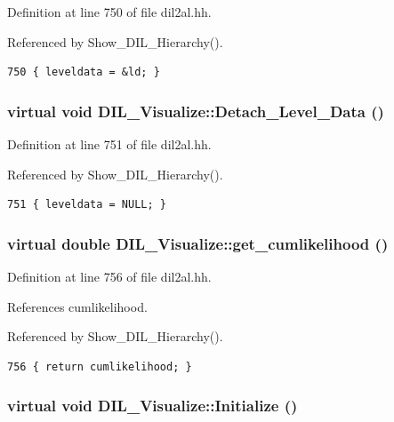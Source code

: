 Definition at line 750 of file dil2al.hh.

Referenced by Show\_\-DIL\_\-Hierarchy().



\footnotesize\begin{verbatim}750 { leveldata = &ld; }
\end{verbatim}\normalsize 
{}
\subsubsection{\setlength{\rightskip}{0pt plus 5cm}virtual void DIL\_\-Visualize::Detach\_\-Level\_\-Data ()\hspace{0.3cm}{\tt  [inline, virtual]}}\label{classDIL__Visualize_a3}




Definition at line 751 of file dil2al.hh.

Referenced by Show\_\-DIL\_\-Hierarchy().



\footnotesize\begin{verbatim}751 { leveldata = NULL; }
\end{verbatim}\normalsize 
{}
\subsubsection{\setlength{\rightskip}{0pt plus 5cm}virtual double DIL\_\-Visualize::get\_\-cumlikelihood ()\hspace{0.3cm}{\tt  [inline, virtual]}}\label{classDIL__Visualize_a8}




Definition at line 756 of file dil2al.hh.

References cumlikelihood.

Referenced by Show\_\-DIL\_\-Hierarchy().



\footnotesize\begin{verbatim}756 { return cumlikelihood; }
\end{verbatim}\normalsize 
{}
\subsubsection{\setlength{\rightskip}{0pt plus 5cm}virtual void DIL\_\-Visualize::Initialize ()\hspace{0.3cm}{\tt  [virtual]}}\label{classDIL__Visualize_a1}




